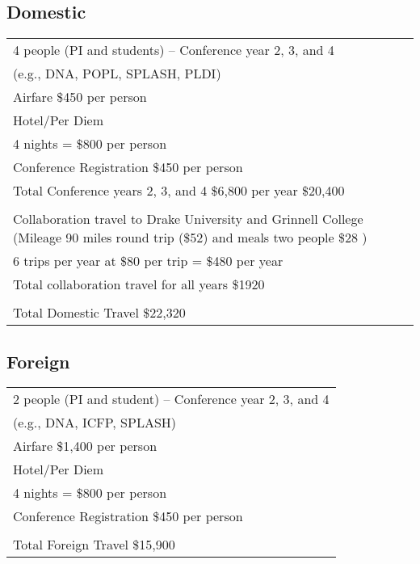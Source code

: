 \documentclass[11pt]{article}
\begin{document}
\subsection*{Domestic}
\begin{center}
	\begin{tabular}{|p{4in}|}
		\hline 4 people (PI and students) -- Conference year 2, 3, and 4 \\ (e.g., DNA, POPL, SPLASH, PLDI) \\
		\hline Airfare \$450 per person \\
		\hline Hotel/Per Diem\\  4 nights = \$800 per person \\
		\hline Conference Registration \$450 per person \\
		\hline Total Conference years 2, 3, and 4 \$6,800 per year \$20,400 \\
		\hline \\
		\hline Collaboration travel to Drake University and Grinnell College  (Mileage 90 miles round trip (\$52) and meals two people \$28 ) \\
		\hline 6 trips per year at \$80 per trip = \$480  per year\\
		\hline Total collaboration travel for all years \$1920\\
		\hline \\
		\hline Total Domestic Travel \$22,320 \\
		\hline
	\end{tabular}
\end{center}

\subsection*{Foreign}
\begin{center}
	\begin{tabular}{|p{4in}|}
		\hline 2 people (PI and student) -- Conference year 2, 3, and 4 \\ (e.g., DNA, ICFP, SPLASH) \\
		\hline Airfare \$1,400 per person\\
		\hline Hotel/Per Diem\\  4 nights = \$800 per person \\
		\hline Conference Registration \$450 per person \\
		\hline \\
		\hline Total Foreign Travel \$15,900 \\
		\hline
	\end{tabular}
\end{center}
	
\end{document}
